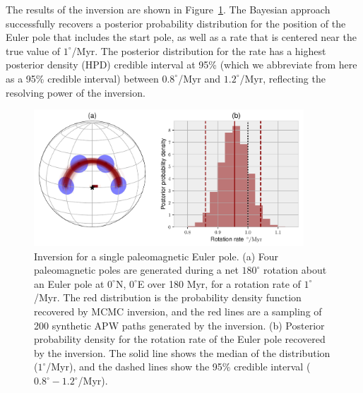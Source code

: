 \documentclass[preprint,12pt,authoryear]{elsarticle}
\begin{document}
The results of the inversion are shown in Figure~\ref{fig:one_euler_pole}.
The Bayesian approach successfully recovers a posterior probability distribution for the position
of the Euler pole that includes the start pole, as well as a rate that is centered
near the true value of $1^\circ$/Myr. The posterior distribution for the rate
has a highest posterior density (HPD) credible interval at 95\% 
(which we abbreviate from here as a 95\% credible interval)
between $0.8^\circ$/Myr and $1.2^\circ$/Myr, reflecting the resolving power of the inversion.

\begin{figure}
\includegraphics[width=0.9\textwidth]{figures/synthetic/one_euler_pole.pdf}
\caption[Inversion for a single paleomagnetic Euler pole.]{Inversion for a single paleomagnetic Euler pole. (a) Four paleomagnetic poles are generated during a net $180^\circ$ rotation about an Euler pole at $0^\circ$N, $0^\circ$E over 180 Myr, for a rotation rate of $1^\circ$/Myr. The red distribution is the probability density function recovered by MCMC inversion, and the red lines are a sampling of 200 synthetic APW paths generated by the inversion. (b) Posterior probability density for the rotation rate of the Euler pole recovered by the inversion. The solid line shows the median of the distribution ($1^\circ$/Myr), and the dashed lines show the 95\% credible interval ($0.8^\circ-1.2^\circ$/Myr). }
\label{fig:one_euler_pole}
\end{figure}
\end{document}
